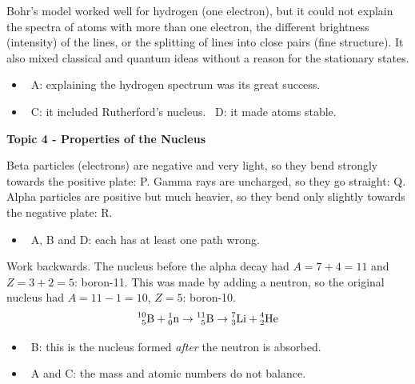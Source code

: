 \documentclass[12pt]{article}
\newcommand\anstopic[1]{\par\Needspace{8\baselineskip}\vspace{4mm}%
  \begin{center}{\headfont\bfseries\fontsize{14}{18}\selectfont #1\par}\end{center}\vspace{2pt}}
\newcommand\nuc[3]{\ensuremath{\prescript{#1}{#2}{\mathrm{#3}}}}
\begin{document}
\begin{practiceanswers}
\begin{practiceans}
  Bohr's model worked well for hydrogen (one electron), but it could not explain the spectra of atoms
  with more than one electron, the different brightness (intensity) of the lines, or the splitting of lines
  into close pairs (fine structure). It also mixed classical and quantum ideas without a reason for the
  stationary states.
  \begin{itemize}
    \item \xmark\ A: explaining the hydrogen spectrum was its great success.
    \item \xmark\ C: it included Rutherford's nucleus. \quad \xmark\ D: it made atoms stable.
  \end{itemize}
\end{practiceans}

\anstopic{Topic 4 - Properties of the Nucleus}

\begin{practiceans}
  Beta particles (electrons) are negative and very light, so they bend strongly towards the positive
  plate: P. Gamma rays are uncharged, so they go straight: Q. Alpha particles are positive but much
  heavier, so they bend only slightly towards the negative plate: R.
  \begin{itemize}
    \item \xmark\ A, B and D: each has at least one path wrong.
  \end{itemize}
\end{practiceans}

\begin{practiceans}
  Work backwards. The nucleus before the alpha decay had $A = 7 + 4 = 11$ and $Z = 3 + 2 = 5$: boron-11.
  This was made by adding a neutron, so the original nucleus had $A = 11 - 1 = 10$, $Z = 5$: boron-10.
  \[ \nuc{10}{5}{B} + \nuc{1}{0}{n} \rightarrow \nuc{11}{5}{B} \rightarrow \nuc{7}{3}{Li} + \nuc{4}{2}{He} \]
  \begin{itemize}
    \item \xmark\ B: this is the nucleus formed \emph{after} the neutron is absorbed.
    \item \xmark\ A and C: the mass and atomic numbers do not balance.
  \end{itemize}
\end{practiceans}


\end{practiceanswers}
\end{document}
